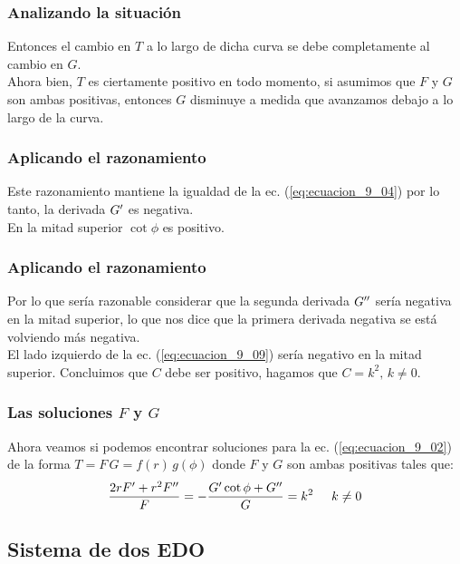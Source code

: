 \documentclass[12pt]{beamer}
\begin{document}
\begin{frame}
\frametitle{Analizando la situación}
Entonces el cambio en $T$ a lo largo de dicha curva se debe completamente al cambio en $G$. 
\\
\bigskip
\pause
Ahora bien, $T$ es ciertamente positivo en todo momento, si asumimos que $F$ y $G$ son ambas positivas, entonces $G$ disminuye a medida que avanzamos debajo a lo largo de la curva.
\end{frame}
\begin{frame}
\frametitle{Aplicando el razonamiento}
Este razonamiento mantiene la igualdad de la ec. (\ref{eq:ecuacion_9_04}) por lo tanto, la derivada ${G}^{\prime}$ es negativa.
\\
\bigskip
\pause
En la mitad superior $\cot \phi$ es positivo.
\end{frame}
\begin{frame}
\frametitle{Aplicando el razonamiento}
Por lo que sería razonable considerar que la segunda derivada ${G}^{\prime \prime}$ sería negativa en la mitad superior, \pause lo que nos dice que la primera derivada negativa se está volviendo más negativa.
\\
\bigskip
\pause
El lado izquierdo de la ec. (\ref{eq:ecuacion_9_09}) sería negativo en la mitad superior. \pause Concluimos que $C$ debe ser positivo, \pause hagamos que $C = k^{2}, \, k \neq 0$.
\end{frame}
\begin{frame}
\frametitle{Las soluciones $F$ y $G$}
Ahora veamos si podemos encontrar soluciones para la ec. (\ref{eq:ecuacion_9_02}) de la forma $T = F \, G = f(r) \, g(\phi)$ donde $F$ y $G$ son ambas positivas tales que:
\pause
\begin{align}
\dfrac{2 r {F}^{\prime} + r^{2} {F}^{\prime \prime}}{F} = - \dfrac{{G}^{\prime} \cot \phi + {G}^{\prime \prime}}{G} = k^{2} \hspace{0.5cm} k \neq 0
\label{eq:ecuacion_9_10}
\end{align}
\end{frame}

\subsection{Sistema de dos EDO}
\end{document}

